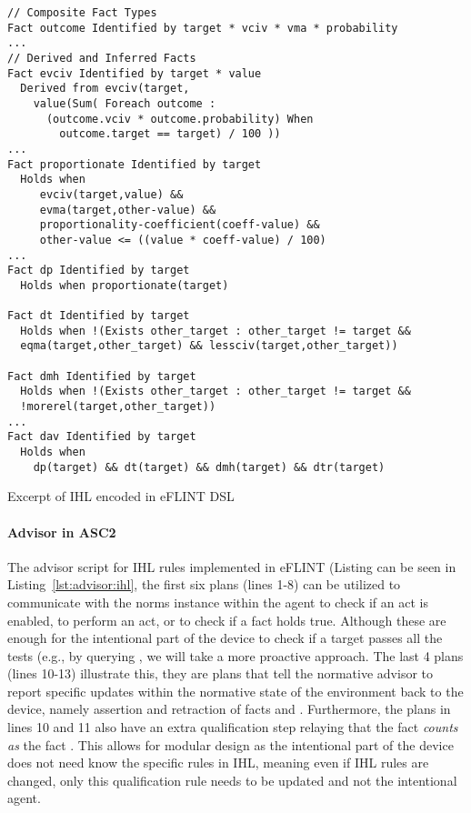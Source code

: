 \begin{listing}[t]
\centering
\begin{tcolorbox}[left=2pt,right=2pt,top=2pt,bottom=2pt]
\begin{verbatim}
// Composite Fact Types
Fact outcome Identified by target * vciv * vma * probability
...
// Derived and Inferred Facts
Fact evciv Identified by target * value
  Derived from evciv(target, 
    value(Sum( Foreach outcome : 
      (outcome.vciv * outcome.probability) When 
        outcome.target == target) / 100 ))
...
Fact proportionate Identified by target
  Holds when
     evciv(target,value) &&
     evma(target,other-value) &&
     proportionality-coefficient(coeff-value) &&
     other-value <= ((value * coeff-value) / 100)
...
Fact dp Identified by target
  Holds when proportionate(target)
  
Fact dt Identified by target
  Holds when !(Exists other_target : other_target != target &&
  eqma(target,other_target) && lessciv(target,other_target))

Fact dmh Identified by target
  Holds when !(Exists other_target : other_target != target &&
  !morerel(target,other_target))
...  
Fact dav Identified by target
  Holds when 
    dp(target) && dt(target) && dmh(target) && dtr(target)
\end{verbatim}
\end{tcolorbox}
\caption{Excerpt of IHL encoded in eFLINT DSL}
\label{listing:eflint:ihl}
\end{listing}

\paragraph{Advisor in ASC2}
The advisor script for IHL rules implemented in eFLINT (Listing can be seen in Listing~\ref{lst:advisor:ihl}, the first six plans (lines 1-8) can be utilized to communicate with the norms instance within the agent to check if an act is enabled, to perform an act, or to check if a fact holds true. Although these are enough for the intentional part of the device to check if a target passes all the tests (e.g., by querying , we will take a more proactive approach. The last 4 plans (lines 10-13) illustrate this, they are plans that tell the normative advisor to report specific updates within the normative state of the environment back to the device, namely assertion and retraction of facts  and . Furthermore, the plans in lines 10 and 11 also have an extra qualification step relaying that the fact  \textit{counts as} the fact . This allows for modular design as the intentional part of the device does not need know the specific rules in IHL, meaning even if IHL rules are changed, only this qualification rule needs to be updated and not the intentional agent.

